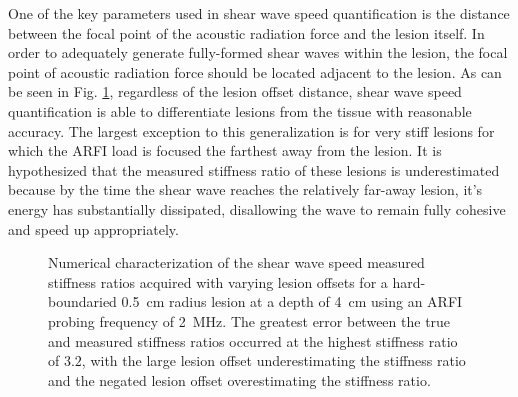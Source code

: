 			One of the key parameters used in shear wave speed quantification is the distance between the focal point of the acoustic radiation force and the lesion itself. In order to adequately generate fully-formed shear waves within the lesion, the focal point of acoustic radiation force should be located adjacent to the lesion. As can be seen in Fig. \ref{fig:erel_doff_d4}, regardless of the lesion offset distance, shear wave speed quantification is able to differentiate lesions from the tissue with reasonable accuracy. The largest exception to this generalization is for very stiff lesions for which the ARFI load is focused the farthest away from the lesion. It is hypothesized that the measured stiffness ratio of these lesions is underestimated because by the time the shear wave reaches the relatively far-away lesion, it's energy has substantially dissipated, disallowing the wave to remain fully cohesive and speed up appropriately.

			\begin{figure}[!htb]
				\centering
				\caption[Numerical characterization of shear wave speed measured stiffness ratio with changing lesion offsets]{Numerical characterization of the shear wave speed measured stiffness ratios acquired with varying lesion offsets for a hard-boundaried \SI{0.5}{cm} radius lesion at a depth of \SI{4}{\cm} using an ARFI probing frequency of \SI{2}{\MHz}. The greatest error between the true and measured stiffness ratios occurred at the highest stiffness ratio of $3.2$, with the large lesion offset underestimating the stiffness ratio and the negated lesion offset overestimating the stiffness ratio.}
				\label{fig:erel_doff_d4}
			\end{figure}

